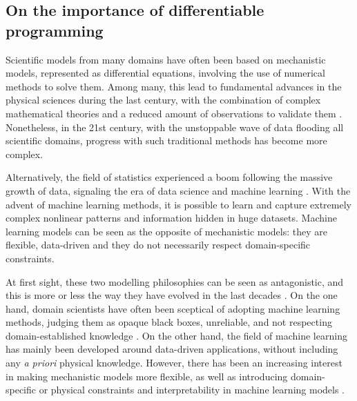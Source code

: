 \subsection{On the importance of differentiable programming}

Scientific models from many domains have often been based on mechanistic models, represented as differential equations, involving the use of numerical methods to solve them. 
Among many, this lead to fundamental advances in the physical sciences during the last century, with the combination of complex mathematical theories and a reduced amount of observations to validate them
\cite{Wigner.1960, Rude:2018jv}. 
Nonetheless, in the 21st century, with the unstoppable wave of data flooding all scientific domains, progress with such traditional methods has become more complex. 

Alternatively, the field of statistics experienced a boom following the massive growth of data, signaling the era of data science and machine learning \cite{Cox:2017hv}.
With the advent of machine learning methods, it is possible to learn and capture extremely complex nonlinear patterns and information hidden in huge datasets. 
Machine learning models can be seen as the opposite of mechanistic models: they are flexible, data-driven and they do not necessarily respect domain-specific constraints.

At first sight, these two modelling philosophies can be seen as antagonistic, and this is more or less the way they have evolved in the last decades \cite{zdeborova_understanding_2020}. 
On the one hand, domain scientists have often been sceptical of adopting machine learning methods, judging them as opaque black boxes, unreliable, and not respecting domain-established knowledge \cite{Coveney:2016eb}.
On the other hand, the field of machine learning has mainly been developed around data-driven applications, without including any \textit{a priori} physical knowledge. 
However, there has been an increasing interest in making mechanistic models more flexible, as well as introducing domain-specific or physical constraints and interpretability in machine learning models \cite{Molnar.2020sisk,Rudin.2022}.

